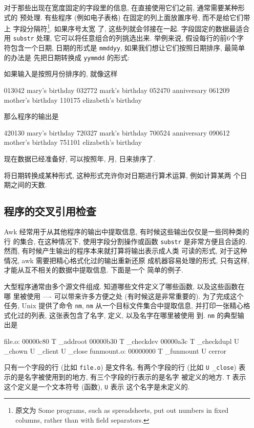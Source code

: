 对于那些出现在宽度固定的字段里的信息, 在直接使用它们之前, 通常需要某种形式的
预处理. 有些程序 (例如电子表格) 在固定的列上面放置序号, 而不是给它们带上
字段分隔符\footnote{原文为 Some programs, such as spreadsheets, put out
numbers in fixed columns, rather than with field separators.}. 如果序号太宽
了, 这些列就会邻接在一起. 字段固定的数据最适合用 \verb'substr' 处理,
它可以将任意组合的列挑选出来. 举例来说, 假设每行的前6个字符包含一个日期, 
日期的形式是 \verb'mmddyy', 如果我们想让它们按照日期排序, 最简单的办法是
先把日期转换成 \verb'yymmdd' 的形式:
如果输入是按照月份排序的, 就像这样
\begin{shell}
    013042 mary's birthday
    032772 mark's birthday
    052470 anniversary
    061209 mother's birthday
    110175 elizabeth's birthday
\end{shell}
那么程序的输出是
\begin{shell}
    420130 mary's birthday
    720327 mark's birthday
    700524 anniversary
    090612 mother's birthday
    751101 elizabeth's birthday
\end{shell}
现在数据已经准备好, 可以按照年, 月, 日来排序了.

\begin{exercise}
    将日期转换成某种形式, 这种形式充许你对日期进行算术运算, 例如计算某两
    个日期之间的天数.
\end{exercise}

\subsection{程序的交叉引用检查}
\label{subsec:program_cross_reference_checking}

Awk 经常用于从其他程序的输出中提取信息, 有时候这些输出仅仅是一些同种类的行
的集合, 在这种情况下, 使用字段分割操作或函数 \verb'substr'
是非常方便且合适的. 然而, 有时候产生输出的程序本来就打算将输出表示成人类
可读的形式, 对于这种情况, awk 需要把精心格式化过的输出重新还原
成机器容易处理的形式, 只有这样, 才能从互不相关的数据中提取信息. 下面是一个
简单的例子.

大型程序通常由多个源文件组成. 知道哪些文件定义了哪些函数, 以及这些函数在哪
里被使用 ---- 可以带来许多方便之处 (有时候这是非常重要的). 为了完成这个
任务, Unix 提供了命令 \verb'nm', \verb'nm' 从一个目标文件集合中提取信息,
并打印一张精心格式化过的列表, 这张表包含了名字, 定义, 以及名字在哪里被使用
到. \verb'nm' 的典型输出是
\begin{shell}
    file.o:
    00000c80 T _addroot
    00000b30 T _checkdev
    00000a3c T _checkdupl
             U _chown
             U _client
             U _close
    funmount.o:
    00000000 T _funmount
             U cerror
\end{shell}
只有一个字段的行 (比如 \verb'file.o') 是文件名, 有两个字段的行 (比如 
\verb'U _close') 表示的是名字被使用到的地方, 有三个字段的行表示的是名字
被定义的地方. \verb'T' 表示这个定义是一个文本符号 (函数), \verb'U' 表示 
这个名字是未定义的.

